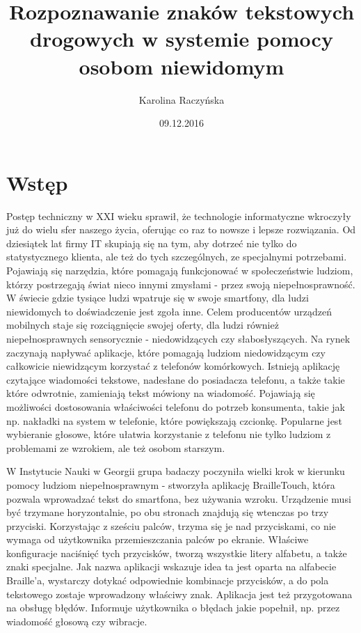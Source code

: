 \documentclass[eng,oneside]{mgr}
\title{Rozpoznawanie znaków tekstowych drogowych w systemie pomocy osobom niewidomym}
\author{Karolina Raczyńska}
\date{09.12.2016}
\begin{document}
\maketitle
\tableofcontents 

\chapter{Wstęp}
Postęp techniczny w XXI wieku sprawił, że technologie informatyczne wkroczyły już do wielu sfer naszego życia, oferując co raz to nowsze i lepsze rozwiązania. Od dziesiątek lat firmy IT skupiają się na tym, aby dotrzeć nie tylko do statystycznego klienta, ale też do tych szczególnych, ze specjalnymi potrzebami. Pojawiają się narzędzia, które pomagają funkcjonować w społeczeństwie ludziom, którzy postrzegają świat nieco innymi zmysłami - przez swoją niepełnosprawność. W świecie gdzie tysiące ludzi wpatruje się w swoje smartfony, dla ludzi niewidomych to doświadczenie jest zgoła inne. Celem producentów urządzeń mobilnych staje się rozciągnięcie swojej oferty, dla ludzi również niepełnosprawnych sensorycznie - niedowidzących czy słabosłyszących. Na rynek zaczynają napływać aplikacje, które pomagają ludziom niedowidzącym czy całkowicie niewidzącym korzystać z telefonów komórkowych. Istnieją aplikację czytające wiadomości tekstowe, nadesłane do posiadacza telefonu, a także takie które odwrotnie, zamieniają tekst mówiony na wiadomość. Pojawiają się możliwości dostosowania właściwości telefonu do potrzeb konsumenta, takie jak np. nakładki na system w telefonie, które powiększają czcionkę. Popularne jest wybieranie głosowe, które ułatwia korzystanie z telefonu nie tylko ludziom z problemami ze wzrokiem, ale też osobom starszym. 
\par W Instytucie Nauki w Georgii grupa badaczy poczyniła wielki krok w kierunku pomocy ludziom niepełnosprawnym - stworzyła aplikację BrailleTouch, która  pozwala wprowadzać tekst do smartfona, bez używania wzroku. Urządzenie musi być trzymane horyzontalnie, po obu stronach znajdują się wtenczas po trzy przyciski. Korzystając z sześciu palców, trzyma się je nad przyciskami, co nie wymaga od użytkownika przemieszczania palców po ekranie. Właściwe konfiguracje naciśnięć tych przycisków, tworzą wszystkie litery alfabetu, a także znaki specjalne. Jak nazwa aplikacji wskazuje idea ta jest oparta na alfabecie Braille'a, wystarczy dotykać odpowiednie kombinacje przycisków, a do pola tekstowego zostaje wprowadzony właściwy znak. Aplikacja jest też przygotowana na obsługę błędów. Informuje użytkownika o błędach jakie popełnił, np. przez wiadomość głosową czy wibracje\cite{touch}. 
\end{document}
